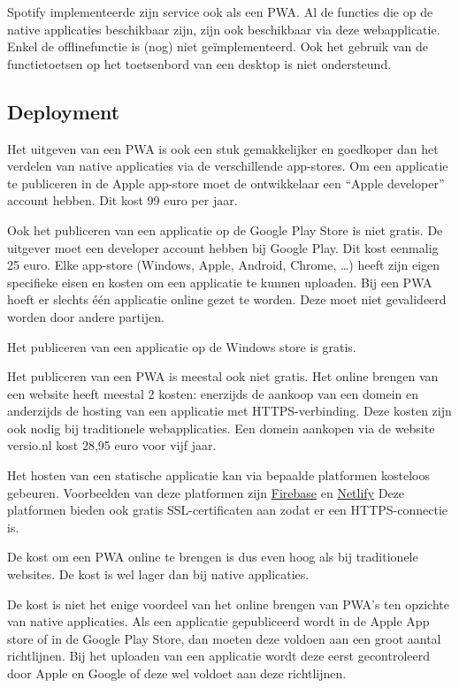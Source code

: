 	Spotify implementeerde zijn service ook als een PWA. \autocite{Spotify2020} Al de functies die op de native applicaties beschikbaar zijn, zijn ook beschikbaar via deze webapplicatie. Enkel de offlinefunctie is (nog) niet geïmplementeerd. Ook het gebruik van de functietoetsen op het toetsenbord van een desktop is niet ondersteund.
	\autocite{Vu2019}
	
	
\subsection{Deployment}

	Het uitgeven van een PWA is ook een stuk gemakkelijker en goedkoper dan het verdelen van native applicaties via de verschillende app-stores. 
	Om een applicatie te publiceren in de Apple app-store moet de ontwikkelaar een “Apple developer” account hebben. Dit kost 99 euro per jaar. 
	\autocite{Apple2020b}
	
	Ook het publiceren van een applicatie op de Google Play Store is niet gratis. De uitgever moet een developer account hebben bij Google Play. Dit kost eenmalig 25 euro.
	Elke app-store (Windows, Apple, Android, Chrome, …) heeft zijn eigen specifieke eisen en kosten om een applicatie te kunnen uploaden. Bij een PWA hoeft er slechts één applicatie online gezet te worden. Deze moet niet gevalideerd worden door andere partijen. 
	\autocite{GooglePlay2020}
	
	Het publiceren van een applicatie op de Windows store is gratis.
	
	Het publiceren van een PWA is meestal ook niet gratis. Het online brengen van een website heeft meestal 2 kosten: enerzijds de aankoop van een domein en anderzijds de hosting van een applicatie met HTTPS-verbinding. Deze kosten zijn ook nodig bij traditionele webapplicaties.
	Een domein aankopen via de website versio.nl kost 28,95 euro voor vijf jaar.
	\autocite{Versio2020}
	
	Het hosten van een statische applicatie kan via bepaalde platformen kosteloos gebeuren. Voorbeelden van deze platformen zijn \href{https://firebase.google.com/}{Firebase} en \href{https://www.netlify.com/}{Netlify}	
	Deze platformen bieden ook gratis SSL-certificaten aan zodat er een HTTPS-connectie is. 
	
	De kost om een PWA online te brengen is dus even hoog als bij traditionele websites. De kost is wel lager dan bij native applicaties. 	
	
	De kost is niet het enige voordeel van het online brengen van PWA's ten opzichte van native applicaties. Als een applicatie gepubliceerd wordt in de Apple App store of in de Google Play Store, dan moeten deze voldoen aan een groot aantal richtlijnen. Bij het uploaden van een applicatie wordt deze eerst gecontroleerd door Apple en Google of deze wel voldoet aan deze richtlijnen. 
	\autocite{Apple2020c}
	\autocite{GooglePlay2020a}
	
